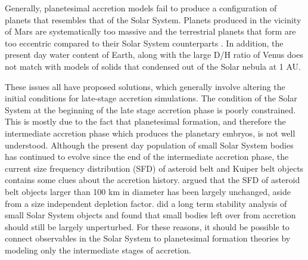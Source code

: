 \documentclass [11pt, proquest] {uwthesis}[2020/02/24]
\begin{document}
Generally, planetesimal accretion models fail to produce a configuration of planets that resembles that of the Solar System. 
Planets produced in the vicinity of Mars are systematically too massive \cite{wetherill92, raymond09, morishima10, izidoro15} 
and the terrestrial planets that form are too eccentric compared to their Solar System counterparts 
\cite{chambers98, agnor99, chambers01}. In addition, the present day water content of Earth, along with the large D/H ratio of 
Venus \cite{donahue82} does not match with models of solids that condensed out of the Solar nebula at 1 AU.

These issues all have proposed solutions, which generally involve altering the initial conditions for late-stage
accretion simulations. The condition of the Solar System at the beginning of the late stage accretion phase is poorly constrained. 
This is mostly due to the fact that planetesimal formation, and therefore the intermediate accretion phase which produces the 
planetary embryos, is not well understood. Although the present day population of small Solar System bodies has continued to 
evolve since the end of the intermediate accretion phase, the current size frequency distribution (SFD) of asteroid belt and 
Kuiper belt objects contains some clues about the accretion history. \cite{morbidelli09} argued that the SFD of asteroid belt 
objects larger than 100 km in diameter has been largely unchanged, aside from a size independent depletion factor. 
\cite{duncan89} did a long term stability analysis of small Solar System objects and found that small bodies left over from 
accretion should still be largely unperturbed. For these reasons, it should be possible to connect observables in the Solar System to planetesimal formation theories by modeling only the intermediate stages of accretion.
\end{document}
